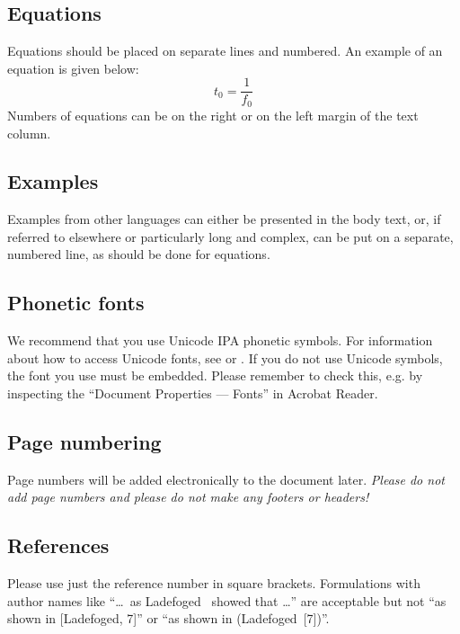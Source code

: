\documentclass[a4paper,11pt,twocolumn]{article}
\begin{document}
\subsection{Equations}

Equations should be placed on separate lines and numbered. An example
of an equation is given below:
\begin{equation}\label{eq:tzero}
t_0 = \frac{1}{f_0}
\end{equation}
Numbers of equations can be on the right or on the left margin of the
text column.

\subsection{Examples}

Examples from other languages can either be presented in the body text, or, if referred to elsewhere or particularly long and complex, can be put on a separate, numbered line, as should be done for equations.


\subsection{Phonetic fonts}

We recommend that you use Unicode IPA phonetic symbols. For information about how to access Unicode fonts, see \cite{IPA-SIL} or \cite{IPA-KEYBOARD}.  If you do not use Unicode symbols, the font you use must be embedded. Please remember to check this,  e.g. by inspecting the ``Document Properties --- Fonts'' in Acrobat Reader.


\subsection{Page numbering}

Page numbers will be added electronically to the document
later. \textit{Please do not add page numbers and please do not make
  any footers or headers!}

\subsection{References}

Please use just the reference number in square brackets. Formulations
with author names like ``\ldots\ as Ladefoged~\cite{Ladefoged:2003}
showed that \ldots'' are acceptable but not ``as shown in [Ladefoged,
7]'' or ``as shown in (Ladefoged~[7])''.
\end{document}
